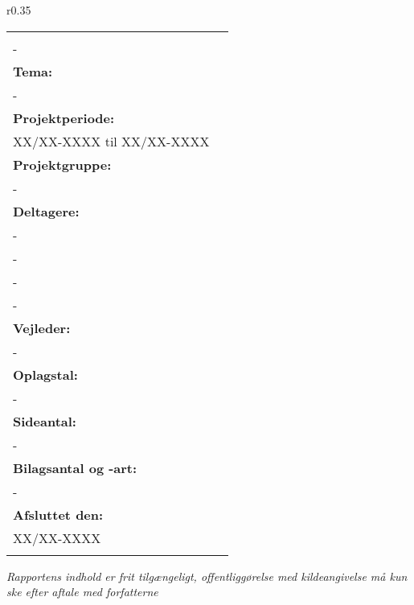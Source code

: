 \thispagestyle{empty}
\renewcommand{\sectionName}{synopsis}

\begin{wrapfigure}{r}{0.35\textwidth}
	\vspace{-170pt}
	\hspace{-45pt}
	\centering
\end{wrapfigure}
\begin{tabular}{p{7.5cm} p{8cm}}
	\tabbox{ 
	\mbox {
		\begin{minipage}{6 cm}
			\textbf{Titel:}\\
			-\\
			\textbf{Tema:}\\
			-\\
			\textbf{Projektperiode:}\\
			XX/XX-XXXX til XX/XX-XXXX\\
			\textbf{Projektgruppe:}\\
			-\\
			\textbf{Deltagere:}\\
			-\\
			-\\
			-\\
			-\\
			\textbf{Vejleder:}\\
			-\\
			\textbf{Oplagstal:}\\
			-\\
			\textbf{Sideantal:}\\
			-\\
			\textbf{Bilagsantal og -art:}\\
			-\\
			\textbf{Afsluttet den:}\\
			XX/XX-XXXX
		\end{minipage}
	}}
	&
	\tabbox[t]{
	\fbox {
		\begin{minipage}{8 cm} 
		-\\					
		\end{minipage}
	}}
\end{tabular}
\null
\vfill
\begin{center}
\textit{{\scriptsize Rapportens indhold er frit tilgængeligt, offentliggørelse  med kildeangivelse må kun ske efter aftale med forfatterne}}
\end{center}